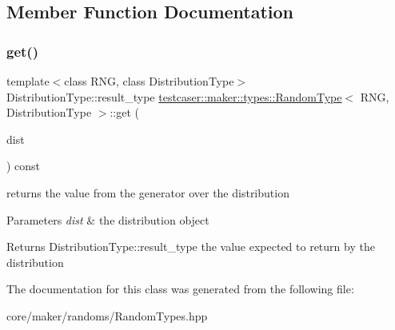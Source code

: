\subsection{Member Function Documentation}
\mbox{\label{classtestcaser_1_1maker_1_1types_1_1RandomType_a48c855182f25804a9b8c55ec5bf9aba5}} 
\subsubsection{\texorpdfstring{get()}{get()}}
{\footnotesize\ttfamily template$<$class R\+NG, class Distribution\+Type$>$ \\
Distribution\+Type\+::result\+\_\+type \mbox{\hyperlink{classtestcaser_1_1maker_1_1types_1_1RandomType}{testcaser\+::maker\+::types\+::\+Random\+Type}}$<$ R\+NG, Distribution\+Type $>$\+::get (\begin{DoxyParamCaption}\item[{Distribution\+Type \&}]{dist }\end{DoxyParamCaption}) const\hspace{0.3cm}{\ttfamily [inline]}}



returns the value from the generator over the distribution 


\begin{DoxyParams}{Parameters}
{\em dist} & the distribution object \\
\hline
\end{DoxyParams}
\begin{DoxyReturn}{Returns}
Distribution\+Type\+::result\+\_\+type the value expected to return by the distribution 
\end{DoxyReturn}


The documentation for this class was generated from the following file\+:\begin{DoxyCompactItemize}
\item 
core/maker/randoms/Random\+Types.\+hpp\end{DoxyCompactItemize}
